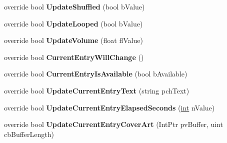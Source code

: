 \begin{DoxyCompactItemize}
\item 
\hypertarget{classValve_1_1Steamworks_1_1CSteamMusicRemote_ae829ab8fbb911d463f53972ea11829c4}{}override bool {\bfseries Update\+Shuffled} (bool b\+Value)\label{classValve_1_1Steamworks_1_1CSteamMusicRemote_ae829ab8fbb911d463f53972ea11829c4}

\item 
\hypertarget{classValve_1_1Steamworks_1_1CSteamMusicRemote_a750ec6898d2216ca68099e92769a55a3}{}override bool {\bfseries Update\+Looped} (bool b\+Value)\label{classValve_1_1Steamworks_1_1CSteamMusicRemote_a750ec6898d2216ca68099e92769a55a3}

\item 
\hypertarget{classValve_1_1Steamworks_1_1CSteamMusicRemote_ab31409ec19e94cf5d4a9e891e5bab2fb}{}override bool {\bfseries Update\+Volume} (float fl\+Value)\label{classValve_1_1Steamworks_1_1CSteamMusicRemote_ab31409ec19e94cf5d4a9e891e5bab2fb}

\item 
\hypertarget{classValve_1_1Steamworks_1_1CSteamMusicRemote_a60cc5c5c6dfeb07be566e1a7b9c59327}{}override bool {\bfseries Current\+Entry\+Will\+Change} ()\label{classValve_1_1Steamworks_1_1CSteamMusicRemote_a60cc5c5c6dfeb07be566e1a7b9c59327}

\item 
\hypertarget{classValve_1_1Steamworks_1_1CSteamMusicRemote_a0a54ed1e7909445c51428a8f1238406a}{}override bool {\bfseries Current\+Entry\+Is\+Available} (bool b\+Available)\label{classValve_1_1Steamworks_1_1CSteamMusicRemote_a0a54ed1e7909445c51428a8f1238406a}

\item 
\hypertarget{classValve_1_1Steamworks_1_1CSteamMusicRemote_aa756ae64054c4708c4253d3f19252bbd}{}override bool {\bfseries Update\+Current\+Entry\+Text} (string pch\+Text)\label{classValve_1_1Steamworks_1_1CSteamMusicRemote_aa756ae64054c4708c4253d3f19252bbd}

\item 
\hypertarget{classValve_1_1Steamworks_1_1CSteamMusicRemote_afc0e3cd39600d84d4df3d24daf9254fb}{}override bool {\bfseries Update\+Current\+Entry\+Elapsed\+Seconds} (\hyperlink{SDL__thread_8h_a6a64f9be4433e4de6e2f2f548cf3c08e}{int} n\+Value)\label{classValve_1_1Steamworks_1_1CSteamMusicRemote_afc0e3cd39600d84d4df3d24daf9254fb}

\item 
\hypertarget{classValve_1_1Steamworks_1_1CSteamMusicRemote_a3639fdb403de0417525ef0ca655d46f9}{}override bool {\bfseries Update\+Current\+Entry\+Cover\+Art} (Int\+Ptr pv\+Buffer, uint cb\+Buffer\+Length)\label{classValve_1_1Steamworks_1_1CSteamMusicRemote_a3639fdb403de0417525ef0ca655d46f9}


\end{DoxyCompactItemize}
